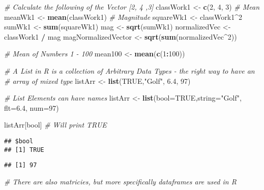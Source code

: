 \documentclass[
]{article}
\newenvironment{Shaded}{\begin{snugshade}}{\end{snugshade}}
\newcommand{\AttributeTok}[1]{\textcolor[rgb]{0.13,0.29,0.53}{#1}}
\newcommand{\CommentTok}[1]{\textcolor[rgb]{0.56,0.35,0.01}{\textit{#1}}}
\newcommand{\ConstantTok}[1]{\textcolor[rgb]{0.56,0.35,0.01}{#1}}
\newcommand{\DecValTok}[1]{\textcolor[rgb]{0.00,0.00,0.81}{#1}}
\newcommand{\FloatTok}[1]{\textcolor[rgb]{0.00,0.00,0.81}{#1}}
\newcommand{\FunctionTok}[1]{\textcolor[rgb]{0.13,0.29,0.53}{\textbf{#1}}}
\newcommand{\NormalTok}[1]{#1}
\newcommand{\OtherTok}[1]{\textcolor[rgb]{0.56,0.35,0.01}{#1}}
\newcommand{\SpecialCharTok}[1]{\textcolor[rgb]{0.81,0.36,0.00}{\textbf{#1}}}
\newcommand{\StringTok}[1]{\textcolor[rgb]{0.31,0.60,0.02}{#1}}
\begin{document}
\begin{Shaded}
\begin{Highlighting}[]
\CommentTok{\# Calculate the following of the Vector [2, 4 ,3]}
\NormalTok{classWork1 }\OtherTok{\textless{}{-}} \FunctionTok{c}\NormalTok{(}\DecValTok{2}\NormalTok{, }\DecValTok{4}\NormalTok{, }\DecValTok{3}\NormalTok{)}
\CommentTok{\# Mean}
\NormalTok{meanWk1 }\OtherTok{\textless{}{-}} \FunctionTok{mean}\NormalTok{(classWork1)}
\CommentTok{\# Magnitude}
\NormalTok{squareWk1 }\OtherTok{\textless{}{-}}\NormalTok{ classWork1}\SpecialCharTok{\^{}}\DecValTok{2}
\NormalTok{sumWk1 }\OtherTok{\textless{}{-}} \FunctionTok{sum}\NormalTok{(squareWk1)}
\NormalTok{mag }\OtherTok{\textless{}{-}} \FunctionTok{sqrt}\NormalTok{(sumWk1) }
\NormalTok{normalizedVec }\OtherTok{\textless{}{-}}\NormalTok{ classWork1 }\SpecialCharTok{/}\NormalTok{ mag}
\NormalTok{magNormalizedVector }\OtherTok{\textless{}{-}} \FunctionTok{sqrt}\NormalTok{(}\FunctionTok{sum}\NormalTok{(normalizedVec}\SpecialCharTok{\^{}}\DecValTok{2}\NormalTok{))}

\CommentTok{\# Mean of Numbers 1 {-} 100}
\NormalTok{mean100 }\OtherTok{\textless{}{-}} \FunctionTok{mean}\NormalTok{(}\FunctionTok{c}\NormalTok{(}\DecValTok{1}\SpecialCharTok{:}\DecValTok{100}\NormalTok{))}

\CommentTok{\# A List in R is a collection of Arbitrary Data Types {-} the right way to have an }
\CommentTok{\# array of mixed type}
\NormalTok{listArr }\OtherTok{\textless{}{-}} \FunctionTok{list}\NormalTok{(}\ConstantTok{TRUE}\NormalTok{,}\StringTok{"Golf"}\NormalTok{, }\FloatTok{6.4}\NormalTok{, }\DecValTok{97}\NormalTok{)}

\CommentTok{\# List Elements can have names}
\NormalTok{listArr }\OtherTok{\textless{}{-}} \FunctionTok{list}\NormalTok{(}\AttributeTok{bool=}\ConstantTok{TRUE}\NormalTok{,}\AttributeTok{string=}\StringTok{"Golf"}\NormalTok{, }\AttributeTok{flt=}\FloatTok{6.4}\NormalTok{, }\AttributeTok{num=}\DecValTok{97}\NormalTok{)}

\NormalTok{listArr[}\StringTok{\textquotesingle{}bool\textquotesingle{}}\NormalTok{] }\CommentTok{\# Will print \textquotesingle{}TRUE\textquotesingle{}}
\end{Highlighting}
\end{Shaded}

\begin{verbatim}
## $bool
## [1] TRUE
\end{verbatim}

\begin{Shaded}
\end{Shaded}

\begin{verbatim}
## [1] 97
\end{verbatim}

\begin{Shaded}
\begin{Highlighting}[]
\CommentTok{\# There are also matricies, but more specifically dataframes are used in R}
\end{Highlighting}
\end{Shaded}
\end{document}

